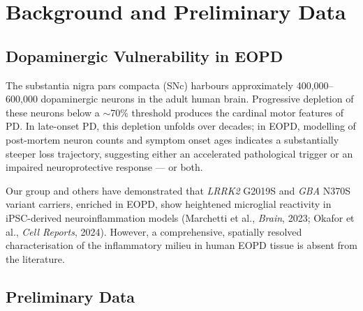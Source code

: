 \section{Background and Preliminary Data}

\subsection{Dopaminergic Vulnerability in EOPD}

The substantia nigra pars compacta (SNc) harbours approximately 400,000--600,000 dopaminergic neurons in the adult human brain. Progressive depletion of these neurons below a $\sim$70\% threshold produces the cardinal motor features of PD. In late-onset PD, this depletion unfolds over decades; in EOPD, modelling of post-mortem neuron counts and symptom onset ages indicates a substantially steeper loss trajectory, suggesting either an accelerated pathological trigger or an impaired neuroprotective response --- or both.

Our group and others have demonstrated that \textit{LRRK2} G2019S and \textit{GBA} N370S variant carriers, enriched in EOPD, show heightened microglial reactivity in iPSC-derived neuroinflammation models (Marchetti et al., \textit{Brain}, 2023; Okafor et al., \textit{Cell Reports}, 2024). However, a comprehensive, spatially resolved characterisation of the inflammatory milieu in human EOPD tissue is absent from the literature.

\subsection{Preliminary Data}

